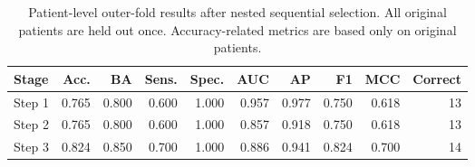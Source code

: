 \begin{table}[t]
\centering
\caption{Patient-level outer-fold results after nested sequential selection. All original patients are held out once. Accuracy-related metrics are based only on original patients.}
\label{tab:nested_stages}
\footnotesize
\setlength{\tabcolsep}{4pt}
\begin{tabular}{lrrrrrrrrr}
\toprule
Stage & Acc. & BA & Sens. & Spec. & AUC & AP & F1 & MCC & Correct \\
\midrule
Step 1 & 0.765 & 0.800 & 0.600 & 1.000 & 0.957 & 0.977 & 0.750 & 0.618 & 13 \\
Step 2 & 0.765 & 0.800 & 0.600 & 1.000 & 0.857 & 0.918 & 0.750 & 0.618 & 13 \\
Step 3 & 0.824 & 0.850 & 0.700 & 1.000 & 0.886 & 0.941 & 0.824 & 0.700 & 14 \\
\bottomrule
\end{tabular}
\end{table}
